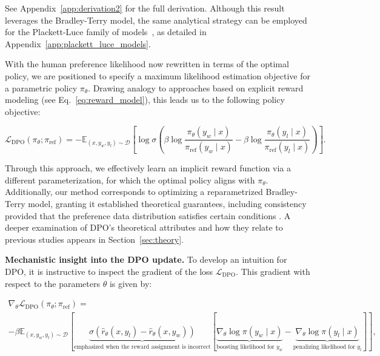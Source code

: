 See Appendix~\ref{app:derivation2} for the full derivation. Although this result leverages the Bradley-Terry model, the same analytical strategy can be employed for the Plackett-Luce family of models~\citep{plackett1975analysis, luce2012individual}, as detailed in Appendix~\ref{app:plackett_luce_models}.

With the human preference likelihood now rewritten in terms of the optimal policy, we are positioned to specify a maximum likelihood estimation objective for a parametric policy $\pi_\theta$. Drawing analogy to approaches based on explicit reward modeling (see Eq.~\ref{eq:reward_model}), this leads us to the following policy objective:

\begin{equation}\label{eq:optimum_model}
    \mathcal{L}_\text{DPO}(\pi_{\theta}; \pi_\text{ref}) = -\mathbb{E}_{(x, y_w, y_l)\sim \mathcal{D}}\left[\log \sigma \left(\beta \log \frac{\pi_{\theta}(y_w\mid x)}{\pi_\text{ref}(y_w\mid x)} - \beta \log \frac{\pi_{\theta}(y_l\mid x)}{\pi_\text{ref}(y_l\mid x)}\right)\right].
\end{equation}

Through this approach, we effectively learn an implicit reward function via a different parameterization, for which the optimal policy aligns with $\pi_\theta$. Additionally, our method corresponds to optimizing a reparametrized Bradley-Terry model, granting it established theoretical guarantees, including consistency provided that the preference data distribution satisfies certain conditions \cite{bong2022generalized}. A deeper examination of DPO's theoretical attributes and how they relate to previous studies appears in Section~\ref{sec:theory}.

\textbf{Mechanistic insight into the DPO update.} To develop an intuition for DPO, it is instructive to inspect the gradient of the loss $\mathcal{L}_\text{DPO}$. This gradient with respect to the parameters $\theta$ is given by:

\begin{multline*}\label{eq:gradient}
    \nabla_\theta \mathcal{L}_\text{DPO}(\pi_\theta;\pi_\text{ref}) = \\ -\beta\mathbb{E}_{(x, y_w, y_l) \sim \mathcal{D}} \left[\underbrace{\sigma(\hat{r}_\theta(x, y_l) - \hat{r}_\theta (x, y_w))}_\text{emphasized when the reward assignment is incorrect}\left[\underbrace{\nabla_\theta\log \pi(y_w \mid x)}_\text{boosting likelihood for $y_w$} - \underbrace{\nabla_\theta\log\pi(y_l \mid x)}_\text{penalizing likelihood for $y_l$}\right]\right],
\end{multline*}

